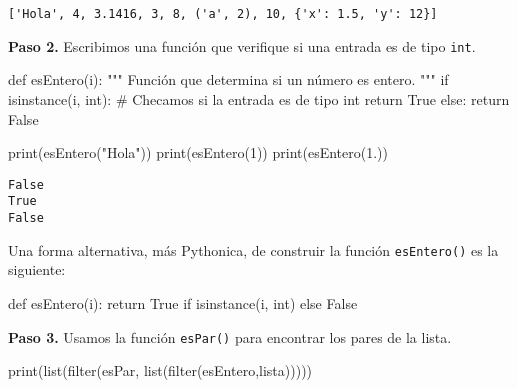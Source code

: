 \documentclass[
  letterpaper,
  DIV=11,
  numbers=noendperiod]{scrreprt}
\newenvironment{Shaded}{\begin{snugshade}}{\end{snugshade}}
\newcommand{\BuiltInTok}[1]{\textcolor[rgb]{0.00,0.23,0.31}{#1}}
\newcommand{\CommentTok}[1]{\textcolor[rgb]{0.37,0.37,0.37}{#1}}
\newcommand{\ControlFlowTok}[1]{\textcolor[rgb]{0.00,0.23,0.31}{#1}}
\newcommand{\DecValTok}[1]{\textcolor[rgb]{0.68,0.00,0.00}{#1}}
\newcommand{\FloatTok}[1]{\textcolor[rgb]{0.68,0.00,0.00}{#1}}
\newcommand{\KeywordTok}[1]{\textcolor[rgb]{0.00,0.23,0.31}{#1}}
\newcommand{\NormalTok}[1]{\textcolor[rgb]{0.00,0.23,0.31}{#1}}
\newcommand{\StringTok}[1]{\textcolor[rgb]{0.13,0.47,0.30}{#1}}
\newcommand{\VariableTok}[1]{\textcolor[rgb]{0.07,0.07,0.07}{#1}}
\begin{document}
\begin{verbatim}
['Hola', 4, 3.1416, 3, 8, ('a', 2), 10, {'x': 1.5, 'y': 12}]
\end{verbatim}

\textbf{Paso 2.} Escribimos una función que verifique si una entrada es
de tipo \texttt{int}.

\begin{Shaded}
\begin{Highlighting}[]
\KeywordTok{def}\NormalTok{ esEntero(i):}
    \CommentTok{"""}
\CommentTok{    Función que determina si un número es entero.}
\CommentTok{    """}
    \ControlFlowTok{if} \BuiltInTok{isinstance}\NormalTok{(i, }\BuiltInTok{int}\NormalTok{): }\CommentTok{\# Checamos si la entrada es de tipo int}
        \ControlFlowTok{return} \VariableTok{True}
    \ControlFlowTok{else}\NormalTok{:}
        \ControlFlowTok{return} \VariableTok{False}
\end{Highlighting}
\end{Shaded}

\begin{Shaded}
\begin{Highlighting}[]
\BuiltInTok{print}\NormalTok{(esEntero(}\StringTok{"Hola"}\NormalTok{))}
\BuiltInTok{print}\NormalTok{(esEntero(}\DecValTok{1}\NormalTok{))}
\BuiltInTok{print}\NormalTok{(esEntero(}\FloatTok{1.}\NormalTok{))}
\end{Highlighting}
\end{Shaded}

\begin{verbatim}
False
True
False
\end{verbatim}

Una forma alternativa, más Pythonica, de construir la función
\texttt{esEntero()} es la siguiente:

\begin{Shaded}
\begin{Highlighting}[]
\KeywordTok{def}\NormalTok{ esEntero(i):}
    \ControlFlowTok{return} \VariableTok{True} \ControlFlowTok{if} \BuiltInTok{isinstance}\NormalTok{(i, }\BuiltInTok{int}\NormalTok{) }\ControlFlowTok{else} \VariableTok{False}
\end{Highlighting}
\end{Shaded}

\textbf{Paso 3.} Usamos la función \texttt{esPar()} para encontrar los
pares de la lista.

\begin{Shaded}
\begin{Highlighting}[]
\BuiltInTok{print}\NormalTok{(}\BuiltInTok{list}\NormalTok{(}\BuiltInTok{filter}\NormalTok{(esPar, }\BuiltInTok{list}\NormalTok{(}\BuiltInTok{filter}\NormalTok{(esEntero,lista)))))}
\end{Highlighting}
\end{Shaded}
\end{document}
